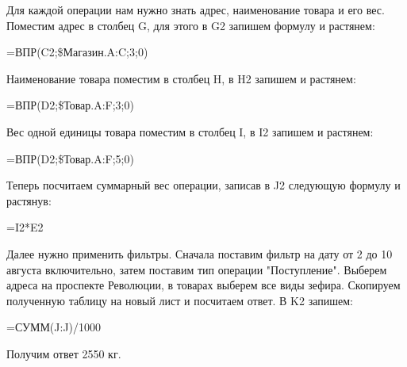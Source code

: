 \documentclass[14pt,a4paper]{article}
\begin{document}
Для каждой операции нам нужно знать адрес, наименование товара и его вес.
Поместим адрес в столбец G, для этого в G2 запишем формулу и растянем:
\begin{center}
    =ВПР(C2;\$Магазин.A:C;3;0)
\end{center}
Наименование товара поместим в столбец H, в H2 запишем и растянем:
\begin{center}
    =ВПР(D2;\$Товар.A:F;3;0)
\end{center}
Вес одной единицы товара поместим в столбец I, в I2 запишем и растянем:
\begin{center}
    =ВПР(D2;\$Товар.A:F;5;0)
\end{center}
Теперь посчитаем суммарный вес операции, записав в J2 следующую формулу и растянув:
\begin{center}
    =I2*E2
\end{center}

Далее нужно применить фильтры. Сначала поставим фильтр на дату от 2 до 10 августа включительно, затем поставим тип операции "Поступление". Выберем адреса на проспекте Революции, в товарах выберем все виды зефира. Скопируем полученную таблицу на новый лист и посчитаем ответ. В K2 запишем:
\begin{center}
    =СУММ(J:J)/1000
\end{center}
Получим ответ 2550 кг.
\end{document}

